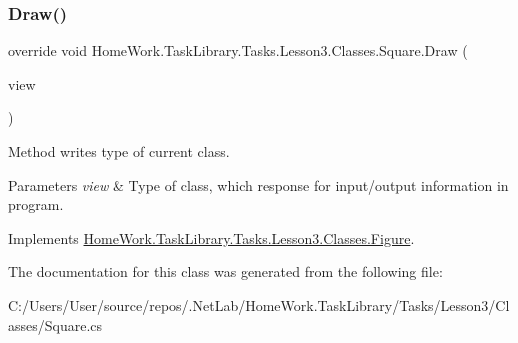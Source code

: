 \subsubsection{\texorpdfstring{Draw()}{Draw()}}
{\footnotesize\ttfamily override void Home\+Work.\+Task\+Library.\+Tasks.\+Lesson3.\+Classes.\+Square.\+Draw (\begin{DoxyParamCaption}\item[{I\+Information}]{view }\end{DoxyParamCaption})\hspace{0.3cm}{\ttfamily [virtual]}}



Method writes type of current class. 


\begin{DoxyParams}{Parameters}
{\em view} & Type of class, which response for input/output information in program.\\
\hline
\end{DoxyParams}


Implements \mbox{\hyperlink{class_home_work_1_1_task_library_1_1_tasks_1_1_lesson3_1_1_classes_1_1_figure_acf9c70a78ffb35ca60f070ded3033391}{Home\+Work.\+Task\+Library.\+Tasks.\+Lesson3.\+Classes.\+Figure}}.



The documentation for this class was generated from the following file\+:\begin{DoxyCompactItemize}
\item 
C\+:/\+Users/\+User/source/repos/.\+Net\+Lab/\+Home\+Work.\+Task\+Library/\+Tasks/\+Lesson3/\+Classes/Square.\+cs\end{DoxyCompactItemize}
